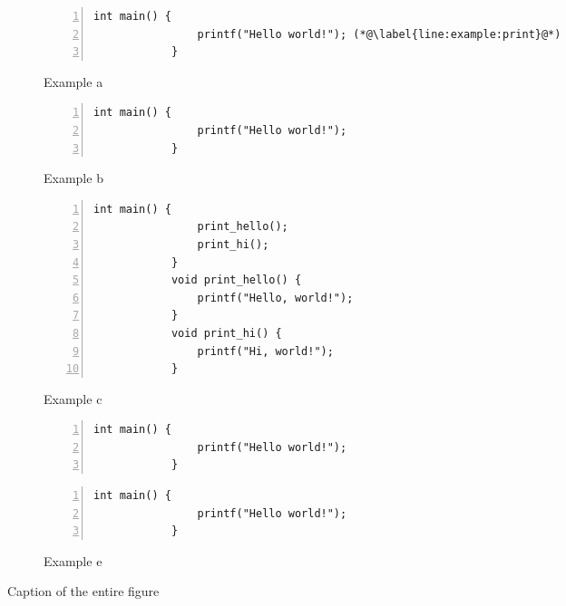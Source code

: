 \begin{figure*}[h]
	\begin{subfigure}{0.48\textwidth}
		\begin{lstlisting}[numbers=left,xleftmargin=2em]
			int main() {
				printf("Hello world!"); (*@\label{line:example:print}@*)
			}
		\end{lstlisting}
		\caption{Example a}
		\label{code:sample:a}
	\end{subfigure}
	\begin{subfigure}{0.48\textwidth}
		\begin{lstlisting}[numbers=left,xleftmargin=2em]
			int main() {
				printf("Hello world!");
			}
		\end{lstlisting}
		\caption{Example b}
		\label{code:sample:b}
	\end{subfigure}
	\begin{subfigure}{0.48\textwidth}
		\begin{lstlisting}[numbers=left,xleftmargin=2em]
			int main() {
				print_hello();
				print_hi();
			}
			void print_hello() {
				printf("Hello, world!");
			}
			void print_hi() {
				printf("Hi, world!");
			}
		\end{lstlisting}
		\caption{Example c}
		\label{code:sample:c}
	\end{subfigure}
	\hfill
	\begin{subfigure}{0.48\textwidth}
		\begin{lstlisting}[numbers=left,xleftmargin=2em]
			int main() {
				printf("Hello world!");
			}
		\end{lstlisting}
		\caption{Example d}
		\label{code:sample:d}
		\begin{lstlisting}[numbers=left,xleftmargin=2em]
			int main() {
				printf("Hello world!");
			}
		\end{lstlisting}
		\caption{Example e}
		\label{code:sample:e}
	\end{subfigure}
	\caption{Caption of the entire figure}
	\label{fig:example}
\end{figure*}
